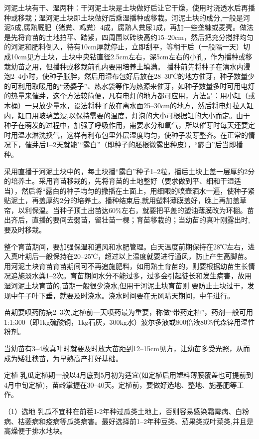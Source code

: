\documentclass{ctexbook}
\begin{document}
河泥土块有干、湿两种：干河泥土块是土块做好后让它干燥，使用时浇透水后再播种或移栽；湿河泥土块即土块做好后乘湿播种或移栽。河泥土块的成分,一般是河泥5成,腐熟厩肥（猪粪、鸡粪）4成，腐熟人粪尿1成，再加一些垄糠或麦壳。做法是先将育苗的土地拍平、踏紧，四周围以砖块高约15--20cm，然后把充分搅拌均匀的河泥和肥料倒入，待有10cm厚就停止，立即刮平，等稍干后（一般隔一天）切成10cm见方土块，土块中央钻直径2.5cm左右，深5cm左右的小孔，作为播种或移栽幼苗之用，但播种或移栽前孔内要用培养土填满。
播种前先将种子在清水内浸泡2--4小时，使种子胀胖，然后用湿布包好后放在28--30℃的地方催芽，种子数量少的可利用取暖用的“汤婆子”、热水袋等作为热源来催芽，如种子数量多时可用电灯的热量来催芽，这个方法较简便，凡有电灯的地方都可应用，方法是：用小缸（或木桶）一只放少量水，设法将种子放在离水面25--30cm的地方，然后将电灯拉入缸内，缸口用玻璃盖没,以保持需要的温度，灯泡的大小可根据缸的大小而定。由于种子在萌发的过程中，加强了呼吸作用，需要水分和氧气，所以催芽时每天还要定时用温水淋洗换气，这样有利布包里外层湿度均匀，使种子发芽整齐。在正常的情况下，催芽后1--2天就能"“露白”（即种子的胚根微露出种皮），“霹白”后当即播种。

采用直播于河泥土块中的，每土块播“露白”种子1--2粒，播后土块上盖一层厚约2分的培养土。采用育苗移栽的，先将育苗的土地整好（要求做到平、细和干湿适当），然后将“露白的种子均匀的撒播在土面上，用细眼的喷壶洒水一遍，使种子紧贴泥土，再盖厚约2分的培养土。播种结束后,就用塑料薄膜盖好，晚上再加盖草帘，以利保温。当种子顶土出苗达60\%左右，就要把平盖的塑油薄膜改为环棚。苗出齐后，直播的要间去弱苗，留壮苗一棵；育苗移栽的；当幼苗的真叶刚露出时,要及时移栽。

整个育苗期间，要加强保温和逋风和水肥管理。白天温度前期保持在28℃左右，进入真叶期后一般保持在20--25℃，超过以上温度就要进行通风，防止产生高脚苗。用河泥土块育苗育苗期间可不再追施肥料，如用熟土育苗的，则要根据幼苗生长情况追施淡水粪1--2次。育苗期间水分不能过多，过多会引起徒长和发生病害，故用湿河泥土块育苗的,苗期一般很少浇水,但用干河泥土块育苗则
要防止土块过干，发现中午子叶下垂，就要及时浇水。浇水时间要在无风晴天期间，中午进行。

苗期要喷药防病2--3次,定植前一天喷药最为重要，称做“带药定植”，药剂一般可用1:1:300（即1kg硫酸铜，1kg石灰，300kg水）波尔多液或800倍液80\%代森锌用湿性粉剂。

当幼苗有3--4枚真叶时就要及时放大苗距到12--15cm见方，让幼苗多受光照，从而成为矮壮秧苗，为早熟高产打好基础。

定植 乳瓜定植期一般以4月底到5月初为适宜(如定植后用塑料薄膜覆盖也可提前到4月中旬定植)，苗龄掌握在30--40天。定植前，要做好选地、整地、施基肥等工作。

（1）选地 乳瓜不宜种在前茬1-2年种过瓜类土地上，否则容易感染霜霉病、白粉病、枯萎病和疫病等瓜类病害。最好选择前1--2年种豆类、茄果类或叶菜类,并且是高燥便于排水地块。
\end{document}
